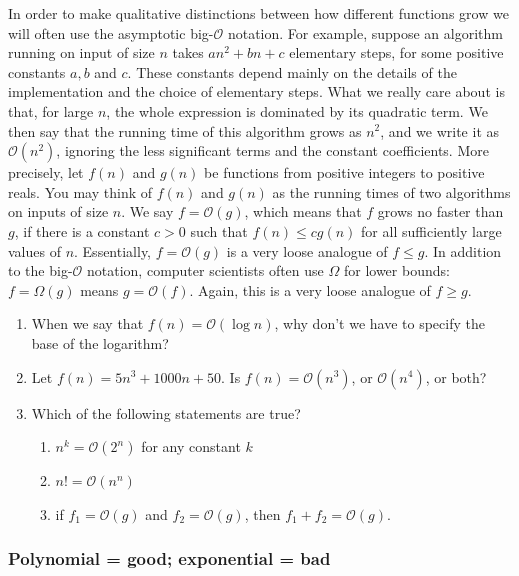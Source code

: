 \documentclass[fleqn,a4paper]{article}
\providecommand{\tightlist}{\setlength{\itemsep}{0pt}\setlength{\parskip}{0pt}}
\renewcommand{\footnote}[1]{\sidenotetext[{\color{white}0}\!\!]{\footnotesize #1}}
\theoremstyle{definition}
\theoremstyle{definition}
\theoremstyle{definition}
\theoremstyle{definition}
\theoremstyle{remark}
\begin{document}
In order to make qualitative distinctions between how different functions grow we will often use the asymptotic big-\(\mathcal{O}\) notation.
For example, suppose an algorithm running on input of size \(n\) takes \(a n^2+bn+c\) elementary steps, for some positive constants \(a, b\) and \(c\).
These constants depend mainly on the details of the implementation and the choice of elementary steps.
What we really care about is that, for large \(n\), the whole expression is dominated by its quadratic term.
We then say that the running time of this algorithm grows as \(n^2\), and we write it as \(\mathcal{O}(n^2)\), ignoring the less significant terms and the constant coefficients.
More precisely, let \(f(n)\) and \(g(n)\) be functions from positive integers to positive reals.
You may think of \(f(n)\) and \(g(n)\) as the running times of two algorithms on inputs of size \(n\).
We say \(f=\mathcal{O}(g)\),\footnote{\(f=\mathcal{O}(g)\) is pronounced as ``\(f\) is big-oh of \(g\)''.} which means that \(f\) grows no faster than \(g\), if there is a constant \(c>0\) such that \(f(n)\leqslant c g(n)\) for all sufficiently large values of \(n\).
Essentially, \(f=\mathcal{O}(g)\) is a very loose analogue of \(f \leqslant g\).
In addition to the big-\(\mathcal{O}\) notation, computer scientists often use \(\Omega\) for lower bounds: \(f=\Omega (g)\) means \(g=\mathcal{O}(f)\).
Again, this is a very loose analogue of \(f \geqslant g\).

\begin{enumerate}
\def\labelenumi{\arabic{enumi}.}
\tightlist
\item
  When we say that \(f(n)=\mathcal{O}(\log n)\), why don't we have to specify the base of the logarithm?
\item
  Let \(f(n)=5n^3+1000n+50\). Is \(f(n)=\mathcal{O}(n^3)\), or \(\mathcal{O}(n^4)\), or both?
\item
  Which of the following statements are true?

  \begin{enumerate}
  \def\labelenumii{\alph{enumii}.}
  \tightlist
  \item
    \(n^k=\mathcal{O}(2^n)\) for any constant \(k\)
  \item
    \(n!=\mathcal{O}(n^n)\)
  \item
    if \(f_1=\mathcal{O}(g)\) and \(f_2=\mathcal{O}(g)\), then \(f_1+f_2=\mathcal{O}(g)\).
  \end{enumerate}
\end{enumerate}

\hypertarget{polynomial-good-exponential-bad}{%
\subsubsection{Polynomial = good; exponential = bad}\label{polynomial-good-exponential-bad}}
\end{document}
